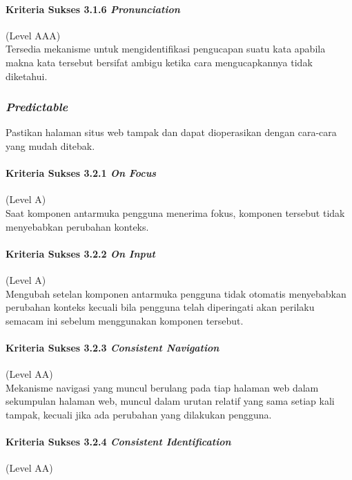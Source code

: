 \paragraph{Kriteria Sukses 3.1.6 \textit{Pronunciation}}
\label{sec:kriteria_sukses_3.1.6}
(Level AAA)\\

Tersedia mekanisme untuk mengidentifikasi pengucapan suatu kata apabila makna kata tersebut bersifat ambigu ketika cara mengucapkannya tidak diketahui.

\subsubsection{\textit{Predictable}}
\label{sec:predictable}
Pastikan halaman situs web tampak dan dapat dioperasikan dengan cara-cara yang mudah ditebak.

\paragraph{Kriteria Sukses 3.2.1 \textit{On Focus}}
\label{sec:kriteria_sukses_3.2.1}
(Level A)\\

Saat komponen antarmuka pengguna menerima fokus, komponen tersebut tidak menyebabkan perubahan konteks.

\paragraph{Kriteria Sukses 3.2.2 \textit{On Input}}
\label{sec:kriteria_sukses_3.2.2}
(Level A)\\

Mengubah setelan komponen antarmuka pengguna tidak otomatis menyebabkan perubahan konteks kecuali bila pengguna telah diperingati akan perilaku semacam ini sebelum menggunakan komponen tersebut.

\paragraph{Kriteria Sukses 3.2.3 \textit{Consistent Navigation}}
\label{sec:kriteria_sukses_3.2.3}
(Level AA)\\

Mekanisme navigasi yang muncul berulang pada tiap halaman web dalam sekumpulan halaman web, muncul dalam urutan relatif yang sama setiap kali tampak, kecuali jika ada perubahan yang dilakukan pengguna.

\paragraph{Kriteria Sukses 3.2.4 \textit{Consistent Identification}}
\label{sec:kriteria_sukses_3.2.4}
(Level AA)\\

